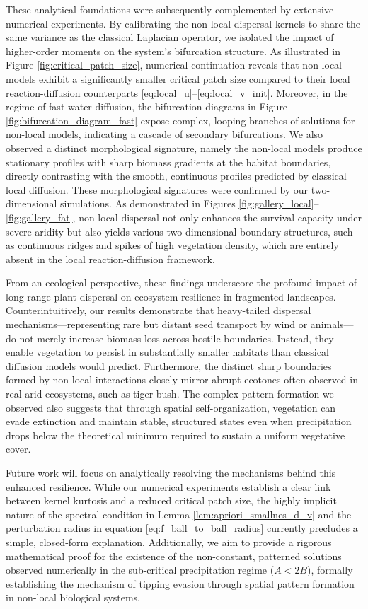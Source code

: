 \documentclass[11pt, a4paper]{article}
\theoremstyle{break}
\theoremstyle{break}
\theoremstyle{break}
\theoremstyle{break}
\theoremstyle{break}
\theoremstyle{break}
\theoremstyle{break}
\theoremstyle{break}
\theoremstyle{break}
\theoremstyle{break}
\begin{document}
These analytical foundations were subsequently complemented by extensive numerical experiments. By calibrating the non-local dispersal kernels to share the same variance as the classical Laplacian operator, we isolated the impact of higher-order moments on the system's bifurcation structure. As illustrated in Figure \ref{fig:critical_patch_size}, numerical continuation reveals that non-local models exhibit a significantly smaller critical patch size compared to their local reaction-diffusion counterparts \eqref{eq:local_u}--\eqref{eq:local_v_init}. Moreover, in the regime of fast water diffusion, the bifurcation diagrams in Figure \ref{fig:bifurcation_diagram_fast} expose complex, looping branches of solutions for non-local models, indicating a cascade of secondary bifurcations. We also observed a distinct morphological signature, namely the non-local models produce stationary profiles with sharp biomass gradients at the habitat boundaries, directly contrasting with the smooth, continuous profiles predicted by classical local diffusion. These morphological signatures were confirmed by our two-dimensional simulations. As demonstrated in Figures \ref{fig:gallery_local}--\ref{fig:gallery_fat}, non-local dispersal not only enhances the survival capacity under severe aridity but also yields various two dimensional boundary structures, such as continuous ridges and spikes of high vegetation density, which are entirely absent in the local reaction-diffusion framework.

From an ecological perspective, these findings underscore the profound impact of long-range plant dispersal on ecosystem resilience in fragmented landscapes. Counterintuitively, our results demonstrate that heavy-tailed dispersal mechanisms---representing rare but distant seed transport by wind or animals---do not merely increase biomass loss across hostile boundaries. Instead, they enable vegetation to persist in substantially smaller habitats than classical diffusion models would predict. Furthermore, the distinct sharp boundaries formed by non-local interactions closely mirror abrupt ecotones often observed in real arid ecosystems, such as tiger bush. The complex pattern formation we observed also suggests that through spatial self-organization, vegetation can evade extinction and maintain stable, structured states even when precipitation drops below the theoretical minimum required to sustain a uniform vegetative cover.

Future work will focus on analytically resolving the mechanisms behind this enhanced resilience. While our numerical experiments establish a clear link between kernel kurtosis and a reduced critical patch size, the highly implicit nature of the spectral condition in Lemma \ref{lem:apriori_smallnes_d_v} and the perturbation radius in equation \eqref{eq:f_ball_to_ball_radius} currently precludes a simple, closed-form explanation. Additionally, we aim to provide a rigorous mathematical proof for the existence of the non-constant, patterned solutions observed numerically in the sub-critical precipitation regime ($A < 2B$), formally establishing the mechanism of tipping evasion through spatial pattern formation in non-local biological systems.
\end{document}
